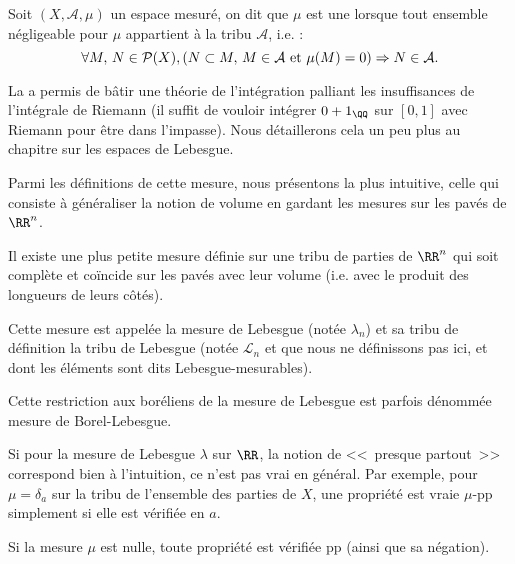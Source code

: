 \begin{definition}
Soit $(X,\mathcal{A},\mu)$ un espace mesuré,
on dit que $\mu$ est une 
lorsque tout ensemble négligeable pour $\mu$ appartient à la tribu $\mathcal{A}$, i.e. :
\begin{equation}
\forall M,\, N\in\mathcal{P}(X), \left(N\subset M,\, M\in\mathcal{A}\hbox{ et }\mu(M)=0\right)\Rightarrow N\in\mathcal{A}.
\end{equation}
\end{definition}

\medskip
La 
a permis de bâtir une théorie de
l'intégration palliant les insuffisances de l'intégrale de Riemann (il suffit de vouloir
intégrer $0+1_{\QQ}$ sur $[0,1]$ avec Riemann pour être dans l'impasse).
Nous détaillerons cela un peu plus au chapitre sur les espaces de Lebesgue.\label{Sec-impasse}

Parmi les définitions de cette mesure, nous présentons la plus intuitive, celle
qui consiste à généraliser la notion de volume en gardant les mesures sur
les pavés de $\RR^n$.

\begin{definition}
Il existe une plus petite mesure définie sur une tribu de parties de $\RR^n$ qui soit
complète et coïncide sur les pavés avec leur volume (i.e. avec le produit des longueurs de leurs côtés).

Cette mesure est appelée la mesure de Lebesgue (notée $\lambda_n$) et sa tribu de définition
la tribu de Lebesgue (notée  $\mathcal L_n$ et que nous ne définissons pas ici, et dont les éléments
sont dits Lebesgue-mesurables).
\end{definition}

Cette restriction aux boréliens de la mesure de Lebesgue est parfois dénommée mesure de Borel-Lebesgue.

Si pour la mesure de Lebesgue $\lambda$ sur $\RR$, la notion de <<~presque partout~>> correspond bien
à l'intuition, ce n'est pas vrai en général.
Par exemple, pour $\mu=\delta_a$ sur la tribu de l'ensemble des parties de $X$, une propriété
est vraie $\mu$-pp simplement si elle est vérifiée en $a$.

Si la mesure $\mu$ est nulle, toute propriété est vérifiée pp (ainsi que sa négation).


